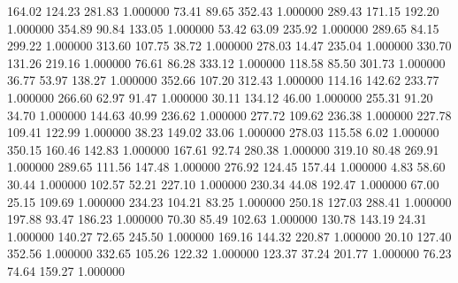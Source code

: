     164.02    124.23    281.83  1.000000
     73.41     89.65    352.43  1.000000
    289.43    171.15    192.20  1.000000
    354.89     90.84    133.05  1.000000
     53.42     63.09    235.92  1.000000
    289.65     84.15    299.22  1.000000
    313.60    107.75     38.72  1.000000
    278.03     14.47    235.04  1.000000
    330.70    131.26    219.16  1.000000
     76.61     86.28    333.12  1.000000
    118.58     85.50    301.73  1.000000
     36.77     53.97    138.27  1.000000
    352.66    107.20    312.43  1.000000
    114.16    142.62    233.77  1.000000
    266.60     62.97     91.47  1.000000
     30.11    134.12     46.00  1.000000
    255.31     91.20     34.70  1.000000
    144.63     40.99    236.62  1.000000
    277.72    109.62    236.38  1.000000
    227.78    109.41    122.99  1.000000
     38.23    149.02     33.06  1.000000
    278.03    115.58      6.02  1.000000
    350.15    160.46    142.83  1.000000
    167.61     92.74    280.38  1.000000
    319.10     80.48    269.91  1.000000
    289.65    111.56    147.48  1.000000
    276.92    124.45    157.44  1.000000
      4.83     58.60     30.44  1.000000
    102.57     52.21    227.10  1.000000
    230.34     44.08    192.47  1.000000
     67.00     25.15    109.69  1.000000
    234.23    104.21     83.25  1.000000
    250.18    127.03    288.41  1.000000
    197.88     93.47    186.23  1.000000
     70.30     85.49    102.63  1.000000
    130.78    143.19     24.31  1.000000
    140.27     72.65    245.50  1.000000
    169.16    144.32    220.87  1.000000
     20.10    127.40    352.56  1.000000
    332.65    105.26    122.32  1.000000
    123.37     37.24    201.77  1.000000
     76.23     74.64    159.27  1.000000

